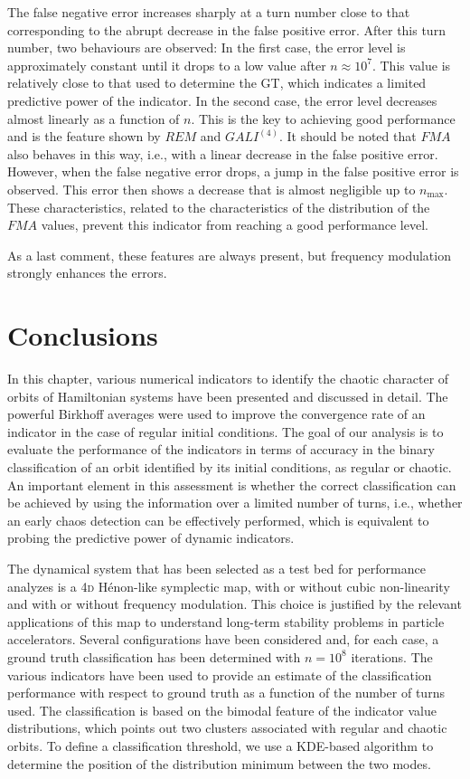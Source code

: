 The false negative error increases sharply at a turn number close to that corresponding to the abrupt decrease in the false positive error. After this turn number, two behaviours are observed: In the first case, the error level is approximately constant until it drops to a low value after $n \approx 10^7$. This value is relatively close to that used to determine the GT, which indicates a limited predictive power of the indicator. In the second case, the error level decreases almost linearly as a function of $n$. This is the key to achieving good performance and is the feature shown by $REM$ and $GALI^{(4)}$. It should be noted that $FMA$ also behaves in this way, i.e., with a linear decrease in the false positive error. However, when the false negative error drops, a jump in the false positive error is observed. This error then shows a decrease that is almost negligible up to $n_\mathrm{max}$. These characteristics, related to the characteristics of the distribution of the $FMA$ values, prevent this indicator from reaching a good performance level. 

As a last comment, these features are always present, but frequency modulation strongly enhances the errors. 
%
\section{\label{sec:dyn:conc} Conclusions}
%
In this chapter, various numerical indicators to identify the chaotic character of orbits of Hamiltonian systems have been presented and discussed in detail. The powerful Birkhoff averages were used to improve the convergence rate of an indicator in the case of regular initial conditions. The goal of our analysis is to evaluate the performance of the indicators in terms of accuracy in the binary classification of an orbit identified by its initial conditions, as regular or chaotic. An important element in this assessment is whether the correct classification can be achieved by using the information over a limited number of turns, i.e., whether an early chaos detection can be effectively performed, which is equivalent to probing the predictive power of dynamic indicators. 

The dynamical system that has been selected as a test bed for performance analyzes is a 4\textsc{d} H\'enon-like symplectic map, with or without cubic non-linearity and with or without frequency modulation. This choice is justified by the relevant applications of this map to understand long-term stability problems in particle accelerators. Several configurations have been considered and, for each case, a ground truth classification has been determined with $n=10^8$ iterations. The various indicators have been used to provide an estimate of the classification performance with respect to ground truth as a function of the number of turns used. The classification is based on the bimodal feature of the indicator value distributions, which points out two clusters associated with regular and chaotic orbits. To define a classification threshold, we use a KDE-based algorithm to determine the position of the distribution minimum between the two modes.


